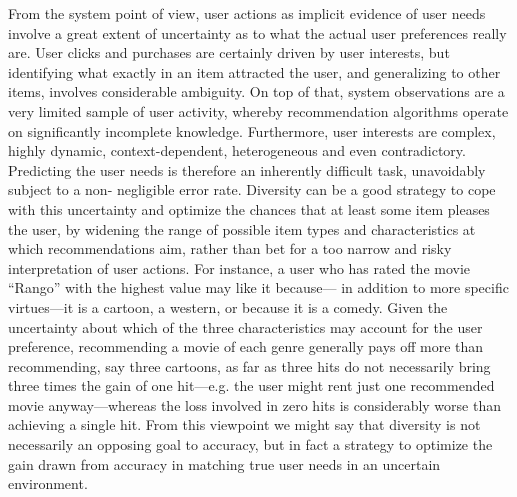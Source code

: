 From the system point of view, user actions as implicit evidence of user needs involve a great extent of uncertainty as to what the actual user preferences really are. User clicks and purchases are certainly driven by user interests, but identifying what exactly in an item attracted the user, and generalizing to other items, involves considerable ambiguity. On top of that, system observations are a very limited sample of user activity, whereby recommendation algorithms operate on significantly incomplete knowledge. Furthermore, user interests are complex, highly dynamic, context-dependent, heterogeneous and even contradictory. Predicting the user needs is therefore an inherently difficult task, unavoidably subject to a non- negligible error rate. Diversity can be a good strategy to cope with this uncertainty and optimize the chances that at least some item pleases the user, by widening the range of possible item types and characteristics at which recommendations aim, rather than bet for a too narrow and risky interpretation of user actions. For instance, a user who has rated the movie “Rango” with the highest value may like it because— in addition to more specific virtues—it is a cartoon, a western, or because it is a comedy. Given the uncertainty about which of the three characteristics may account for the user preference, recommending a movie of each genre generally pays off more than recommending, say three cartoons, as far as three hits do not necessarily bring three times the gain of one hit—e.g. the user might rent just one recommended movie anyway—whereas the loss involved in zero hits is considerably worse than achieving a single hit. From this viewpoint we might say that diversity is not necessarily an opposing goal to accuracy, but in fact a strategy to optimize the gain drawn from accuracy in matching true user needs in an uncertain environment.

